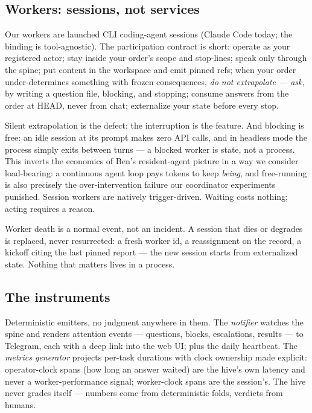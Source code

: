\subsection{Workers: sessions, not services}

Our workers are launched CLI coding-agent sessions (Claude Code today; the binding is tool-agnostic). The participation contract is short: operate as your registered actor; stay inside your order's scope and stop-lines; speak only through the spine; put content in the workspace and emit pinned refs; when your order under-determines something with frozen consequences, \emph{do not extrapolate --- ask}, by writing a question file, blocking, and stopping; consume answers from the order at HEAD, never from chat; externalize your state before every stop.

Silent extrapolation is the defect; the interruption is the feature. And blocking is free: an idle session at its prompt makes zero API calls, and in headless mode the process simply exits between turns --- a blocked worker is state, not a process. This inverts the economics of Ben's resident-agent picture in a way we consider load-bearing: a continuous agent loop pays tokens to keep \emph{being}, and free-running is also precisely the over-intervention failure our coordinator experiments punished. Session workers are natively trigger-driven. Waiting costs nothing; acting requires a reason.

Worker death is a normal event, not an incident. A session that dies or degrades is replaced, never resurrected: a fresh worker id, a reassignment on the record, a kickoff citing the last pinned report --- the new session starts from externalized state. Nothing that matters lives in a process.

\subsection{The instruments}

Deterministic emitters, no judgment anywhere in them. The \emph{notifier} watches the spine and renders attention events --- questions, blocks, escalations, results --- to Telegram, each with a deep link into the web UI; plus the daily heartbeat. The \emph{metrics generator} projects per-task durations with clock ownership made explicit: operator-clock spans (how long an answer waited) are the hive's own latency and never a worker-performance signal; worker-clock spans are the session's. The hive never grades itself --- numbers come from deterministic folds, verdicts from humans.

